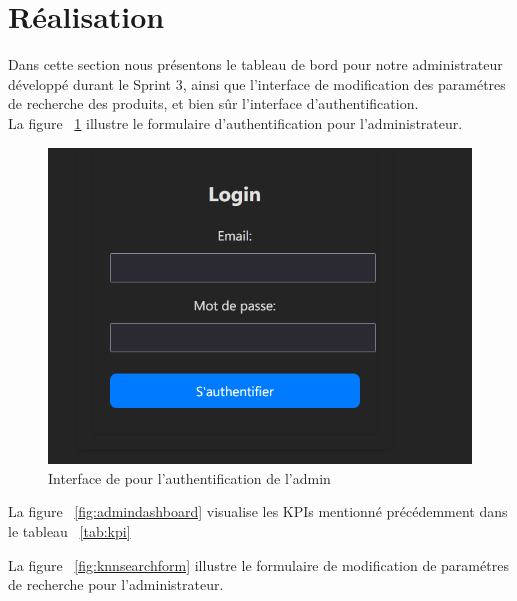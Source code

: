 \section{Réalisation}
\noindent
Dans cette section nous présentons le tableau de bord pour notre administrateur développé durant le Sprint 3, ainsi que l'interface de modification des paramétres de recherche des produits, et bien sûr l'interface d'authentification. \\

\newpage
\noindent
La figure ~\ref{fig:signin} illustre le formulaire d'authentification pour l'administrateur.

\begin{figure}[H]
    \centering
    \includegraphics[width=1\textwidth]{logos/login.png}
    \caption{Interface de pour l'authentification de l'admin}
    \label{fig:signin}
\end{figure}

\newpage
\noindent
La figure ~\ref{fig:admindashboard} visualise les KPIs mentionné précédemment dans le tableau ~\ref{tab:kpi}

\newpage
\noindent
La figure ~\ref{fig:knnsearchform} illustre le formulaire de modification de paramétres de recherche pour l'administrateur.

